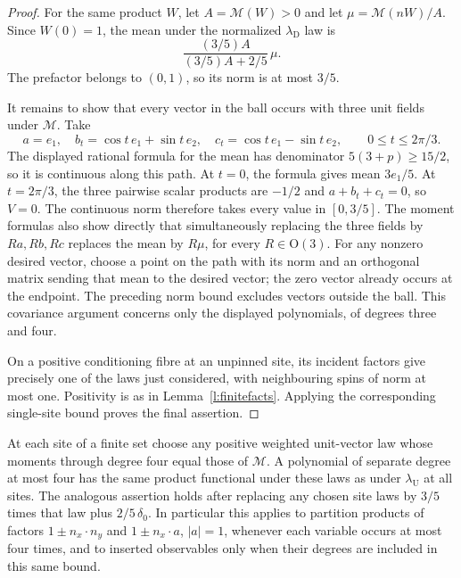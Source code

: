 \begin{proof}
For the same product \(W\), let \(A=\mathcal M(W)>0\) and let
\(\mu=\mathcal M(nW)/A\). Since \(W(0)=1\), the mean under the
normalized \(\lambda_{\mathrm D}\) law is
\[
 \frac{(3/5)A}{(3/5)A+2/5}\,\mu.
\]
The prefactor belongs to \((0,1)\), so its norm is at most \(3/5\).

It remains to show that every vector in the ball occurs with three
unit fields under \(\mathcal M\). Take
\[
 a=e_1,\quad b_t=\cos t\,e_1+\sin t\,e_2,\quad
 c_t=\cos t\,e_1-\sin t\,e_2,\qquad 0\le t\le2\pi/3.
\]
The displayed rational formula for the mean has denominator
\(5(3+p)\ge15/2\), so it is continuous along this path.
At \(t=0\), the formula gives mean \(3e_1/5\).
At \(t=2\pi/3\), the three pairwise scalar products are \(-1/2\)
and \(a+b_t+c_t=0\), so \(V=0\).
The continuous norm therefore takes every value in \([0,3/5]\).
The moment formulas also show directly that simultaneously replacing
the three fields by \(Ra,Rb,Rc\) replaces the mean by \(R\mu\),
for every \(R\in\mathrm O(3)\).
For any nonzero desired vector, choose a point on the path with
its norm and an orthogonal matrix sending that mean to the desired
vector; the zero vector already occurs at the endpoint.
The preceding norm bound excludes vectors outside the ball.
This covariance argument concerns only the displayed polynomials,
of degrees three and four.

On a positive conditioning fibre at an unpinned site, its incident
factors give precisely one of the laws just considered, with
neighbouring spins of norm at most one. Positivity is as in
Lemma~\ref{l:finitefacts}. Applying the corresponding single-site
bound proves the final assertion.
\end{proof}

\begin{lemma}\label{l:exact}
At each site of a finite set choose any positive weighted unit-vector
law whose moments through degree four equal those of \(\mathcal M\).
A polynomial of separate degree at most four has the same product
functional under these laws as under \(\lambda_{\mathrm U}\) at all
sites. The analogous assertion holds after replacing any chosen site
laws by \(3/5\) times that law plus \(2/5\,\delta_0\).
In particular this applies to partition products of factors
\(1\pm n_x\cdot n_y\) and \(1\pm n_x\cdot a\), \(|a|=1\), whenever
each variable occurs at most four times, and to inserted observables
only when their degrees are included in this same bound.
\end{lemma}

